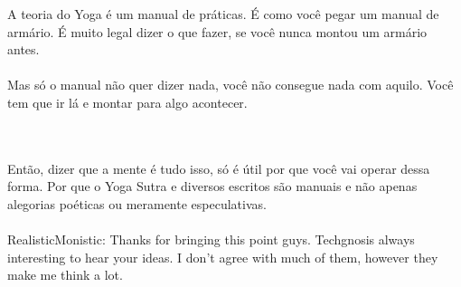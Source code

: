 \documentclass[11pt]{article}
\begin{document}
A teoria do Yoga é um manual de práticas. É como você pegar um manual de armário. É muito legal dizer o que fazer, se você nunca montou um armário antes. \\\\ 

Mas só o manual não quer dizer nada, você não consegue nada com aquilo. Você tem que ir lá e montar para algo acontecer.\\\\\

Então, dizer que a mente é tudo isso, só é útil por que você vai operar dessa forma. Por que o Yoga Sutra e diversos escritos são manuais e não apenas alegorias poéticas ou meramente especulativas.\\\\


RealisticMonistic: Thanks for bringing this point guys. Techgnosis always interesting to hear your ideas. I don't agree with much of them, however they make me think a lot.\\\\\



\end{document}
